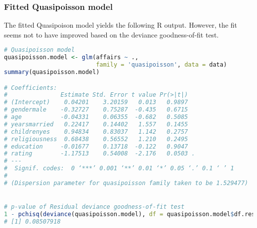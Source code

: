 \documentclass[border=5mm, convert, usenames, dvipsnames,beamer]{standalone}
\begin{document}
\begin{frame}[ fragile]{}
\frametitle{Fitted Quasipoisson model}

\footnotesize
\vspace{15mm}
\noindent
The fitted Quasipoison model yields the following R output. However, the fit seems not to have improved based on the deviance goodness-of-fit test.

\par


\tiny
\begin{lstlisting}[language=R]
# Quasipoisson model
quasipoisson.model <- glm(affairs ~ .,
                          family = 'quasipoisson', data = data)
summary(quasipoisson.model)

# Coefficients:
#               Estimate Std. Error t value Pr(>|t|)  
# (Intercept)    0.04201    3.20159   0.013   0.9897  
# gendermale    -0.32727    0.75287  -0.435   0.6715  
# age           -0.04331    0.06355  -0.682   0.5085  
# yearsmarried   0.22417    0.14402   1.557   0.1455  
# childrenyes    0.94834    0.83037   1.142   0.2757  
# religiousness  0.68438    0.56552   1.210   0.2495  
# education     -0.01677    0.13718  -0.122   0.9047  
# rating        -1.17513    0.54008  -2.176   0.0503 .
# ---
#  Signif. codes:  0 ‘***’ 0.001 ‘**’ 0.01 ‘*’ 0.05 ‘.’ 0.1 ‘ ’ 1
# 
# (Dispersion parameter for quasipoisson family taken to be 1.529477)


# p-value of Residual deviance goodness-of-fit test
1 - pchisq(deviance(quasipoisson.model), df = quasipoisson.model$df.residual)
# [1] 0.08507918
\end{lstlisting}
\par


\end{frame}
\end{document}
